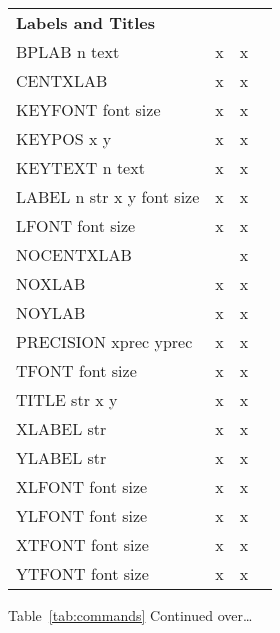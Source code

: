\documentclass{report}
\begin{document}
\begin{center}
\begin{tabular}{lccc}
%  
{\bf Labels and Titles}          &           &        &                    \\
BPLAB  n   text                  &     x     &     x  &                    \\
CENTXLAB                         &     x     &     x  &                    \\
KEYFONT  font   size             &     x     &     x  &                    \\
KEYPOS  x   y                    &     x     &     x  &                    \\
KEYTEXT  n   text                &     x     &     x  &                    \\
LABEL n str x y font size        &     x     &     x  &                    \\
LFONT  font   size               &     x     &     x  &                    \\
NOCENTXLAB                       &           &     x  &                    \\
NOXLAB                           &     x     &     x  &                    \\
NOYLAB                           &     x     &     x  &                    \\
PRECISION  xprec   yprec         &     x     &     x  &                    \\
TFONT  font   size               &     x     &     x  &                    \\
TITLE  str   x   y               &     x     &     x  &                    \\
XLABEL  str                      &     x     &     x  &                    \\
YLABEL  str                      &     x     &     x  &                    \\
XLFONT  font   size              &     x     &     x  &                    \\
YLFONT  font   size              &     x     &     x  &                    \\
XTFONT  font   size              &     x     &     x  &                    \\
YTFONT  font   size              &     x     &     x  &                    \\ \hline
\end{tabular}
\normalsize
\end{center}
Table~\ref{tab:commands} Continued over\ldots
\end{document}
